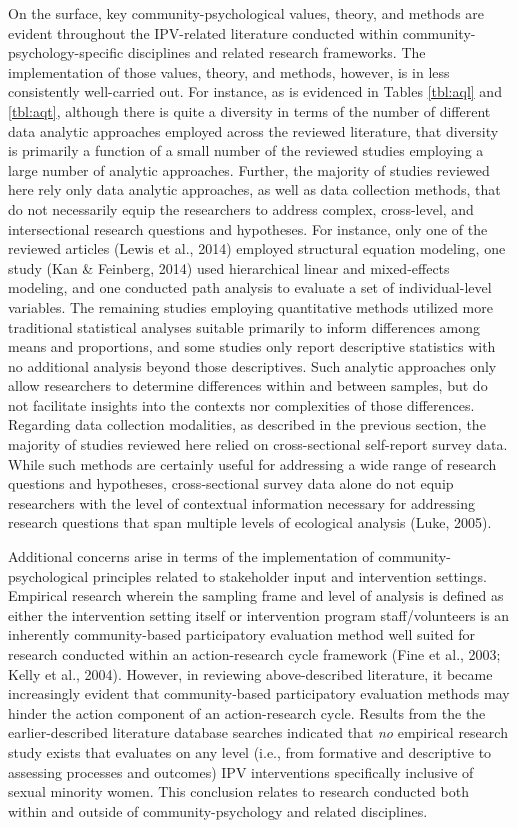 \documentclass[11pt,]{tufte-book}
\begin{document}
On the surface, key community-psychological values, theory, and methods
are evident throughout the IPV-related literature conducted within
community-psychology-specific disciplines and related research
frameworks. The implementation of those values, theory, and methods,
however, is in less consistently well-carried out. For instance, as is
evidenced in Tables \ref{tbl:aql} and \ref{tbl:aqt}, although there is
quite a diversity in terms of the number of different data analytic
approaches employed across the reviewed literature, that diversity is
primarily a function of a small number of the reviewed studies employing
a large number of analytic approaches. Further, the majority of studies
reviewed here rely only data analytic approaches, as well as data
collection methods, that do not necessarily equip the researchers to
address complex, cross-level, and intersectional research questions and
hypotheses. For instance, only one of the reviewed articles (Lewis et
al., 2014) employed structural equation modeling, one study (Kan \&
Feinberg, 2014) used hierarchical linear and mixed-effects modeling, and
one conducted path analysis to evaluate a set of individual-level
variables. The remaining studies employing quantitative methods utilized
more traditional statistical analyses suitable primarily to inform
differences among means and proportions, and some studies only report
descriptive statistics with no additional analysis beyond those
descriptives. Such analytic approaches only allow researchers to
determine differences within and between samples, but do not facilitate
insights into the contexts nor complexities of those differences.
Regarding data collection modalities, as described in the previous
section, the majority of studies reviewed here relied on cross-sectional
self-report survey data. While such methods are certainly useful for
addressing a wide range of research questions and hypotheses,
cross-sectional survey data alone do not equip researchers with the
level of contextual information necessary for addressing research
questions that span multiple levels of ecological analysis (Luke, 2005).

Additional concerns arise in terms of the implementation of
community-psychological principles related to stakeholder input and
intervention settings. Empirical research wherein the sampling frame and
level of analysis is defined as either the intervention setting itself
or intervention program staff/volunteers is an inherently
community-based participatory evaluation method well suited for research
conducted within an action-research cycle framework (Fine et al., 2003;
Kelly et al., 2004). However, in reviewing above-described literature,
it became increasingly evident that community-based participatory
evaluation methods may hinder the action component of an action-research
cycle. Results from the the earlier-described literature database
searches indicated that \emph{no} empirical research study exists that
evaluates on any level (i.e., from formative and descriptive to
assessing processes and outcomes) IPV interventions specifically
inclusive of sexual minority women. This conclusion relates to research
conducted both within and outside of community-psychology and related
disciplines.
\end{document}
